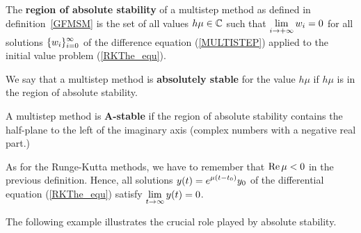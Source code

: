 \begin{defn}
The {\bfseries region of absolute stability} of a multistep method as defined in
definition~\ref{GFMSM} is the set of all values $h\mu \in \mathbb{C}$
such that $\displaystyle \lim_{i\rightarrow +\infty} w_i = 0$ for all
solutions $\displaystyle \{w_i\}_{i=0}^\infty$ of the difference
equation (\ref{MULTISTEP}) applied to the initial value problem
(\ref{RKThe_equ}).

We say that a multistep method is
{\bfseries absolutely stable} for
the value $h\mu$ if $h\mu$ is in the region of absolute stability.

A multistep method is {\bfseries A-stable}
if the region of absolute stability contains the half-plane to the left of
the imaginary axis (complex numbers with a negative real part.)
\end{defn}

\begin{rmk}
As for the Runge-Kutta methods, we have to remember that $\operatorname{Re} \mu < 0$
in the previous definition.  Hence, all solutions
$\displaystyle y(t) = e^{\mu(t-t_0)}y_0$ of the differential equation
(\ref{RKThe_equ}) satisfy $\displaystyle \lim_{t\to \infty} y(t) = 0$.
\end{rmk}

The following example illustrates the crucial role played by
absolute stability.

